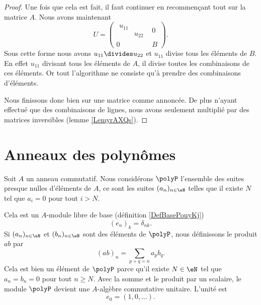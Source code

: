 \begin{proof}
    Une fois que cela est fait, il faut continuer en recommençant tout sur la matrice \( A\). Nous avons maintenant
    \begin{equation}
        U=\begin{pmatrix}
            \begin{matrix}
                u_{11}  &       \\ 
                &   u_{22}    
            \end{matrix}&   0    \\ 
            0    &   B    
        \end{pmatrix}.
    \end{equation}
    Sous cette forme nous avons \( u_{11}\divides u_{22}\) et \( u_{11}\) divise tous les éléments de \( B\). En effet \( u_{11}\) divisant tous les éléments de \( A\), il divise toutes les combinaisons de ces éléments. Or tout l'algorithme ne consiste qu'à prendre des combinaisons d'éléments.

    Nous finissons donc bien sur une matrice comme annoncée. De plus n'ayant effectué que des combinaisons de lignes, nous avons seulement multiplié par des matrices inversibles (lemme \ref{LemyrAXQs}).
\end{proof}

\section{Anneaux des polynômes}

Soit \( A\) un anneau commutatif. Nous considérons \( \polyP\) l'ensemble des suites presque nulles d'éléments de \( A\), ce sont les suites \( (a_n)_{n\in\eN}\) telles que il existe \( N\) tel que \( a_i=0\) pour tout \( i>N\).

Cela est un \( A\)-module libre de base (définition \ref{DefBasePouyKj})
\begin{equation}
    (e_n)_k=\delta_{nk}.
\end{equation}
Si \( (a_n)_{n\in \eN}\) et \( (b_n)_{n\in\eN}\) sont des éléments de \( \polyP\), nous définissons le produit \( ab\) par
\begin{equation}
    (ab)_n=\sum_{p+q=n}a_pb_q.
\end{equation}
Cela est bien un élément de \( \polyP\) parce qu'il existe \( N\in\eN\) tel que \( a_n=b_n=0\) pour tout \( n\geq N\). Avec la somme et le produit par un scalaire, le module \( \polyP\) devient une \( A\)-algèbre commutative unitaire. L'unité est 
\begin{equation}
    e_0=(1,0,\ldots).
\end{equation}

